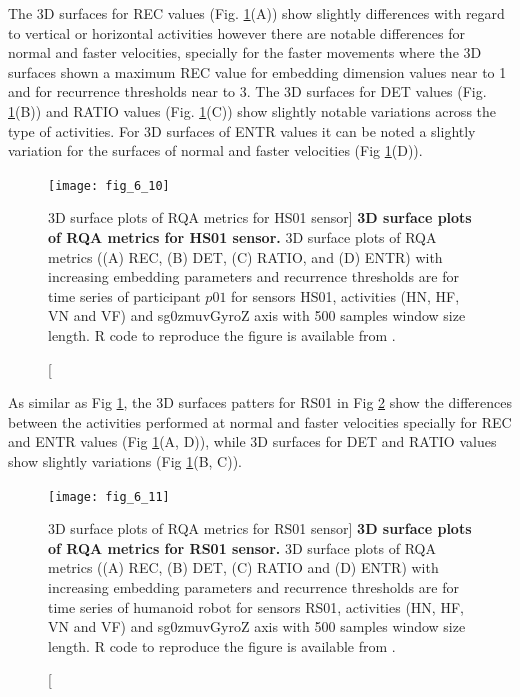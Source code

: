 The 3D surfaces for REC values (Fig. \ref{fig:topo_sa_hs01}(A))
show slightly differences with regard to vertical or horizontal activities
however there are notable differences for normal and faster velocities, 
specially for the faster movements where the 3D surfaces shown a maximum
REC value for embedding dimension values near to 1 and for recurrence 
thresholds near to 3. 
The 3D surfaces for DET values  
(Fig. \ref{fig:topo_sa_hs01}(B)) and RATIO values 
(Fig. \ref{fig:topo_sa_hs01}(C)) show slightly notable variations across 
the type of activities. 
For 3D surfaces of ENTR values it can be noted a slightly variation for
the surfaces of normal and faster velocities (Fig \ref{fig:topo_sa_hs01}(D)).
\begin{figure}
\centering
\texttt{[image: fig\_6\_10]}
    \caption
	[3D surface plots of RQA metrics for HS01 sensor]{
	{\bf 3D surface plots of RQA metrics for HS01 sensor.}
	3D surface plots of RQA metrics ((A) REC, (B) DET, (C) RATIO, and (D) ENTR) 
	with increasing embedding parameters and recurrence thresholds 
	are for time series of participant $p01$ for 
	sensors HS01, activities (HN, HF, VN and VF) and 
	sg0zmuvGyroZ axis with 500 samples window size length. 
	R code to reproduce the figure is available from \cite{hwum2018}.
       }
\label{fig:topo_sa_hs01}
\end{figure}

As similar as Fig \ref{fig:topo_sa_hs01}, the 3D surfaces patters 
for RS01 in Fig \ref{fig:topo_sa_rs01} show the differences between 
the activities performed at normal and faster velocities
specially for REC and ENTR values (Fig \ref{fig:topo_sa_hs01}(A, D)),
while 3D surfaces for DET and RATIO values show slightly variations
(Fig \ref{fig:topo_sa_hs01}(B, C)).
\begin{figure}
\centering
\texttt{[image: fig\_6\_11]}
    \caption
	[3D surface plots of RQA metrics for RS01 sensor]{
	{\bf 3D surface plots of RQA metrics for RS01 sensor.}
	3D surface plots of RQA metrics ((A) REC, (B) DET, (C) RATIO and (D) ENTR) 
	with increasing embedding parameters and recurrence thresholds 
	are for time series of humanoid robot for 
	sensors RS01, activities (HN, HF, VN and VF) and 
	sg0zmuvGyroZ axis with 500 samples window size length. 
	R code to reproduce the figure is available from \cite{hwum2018}.
       }
\label{fig:topo_sa_rs01}
\end{figure}

